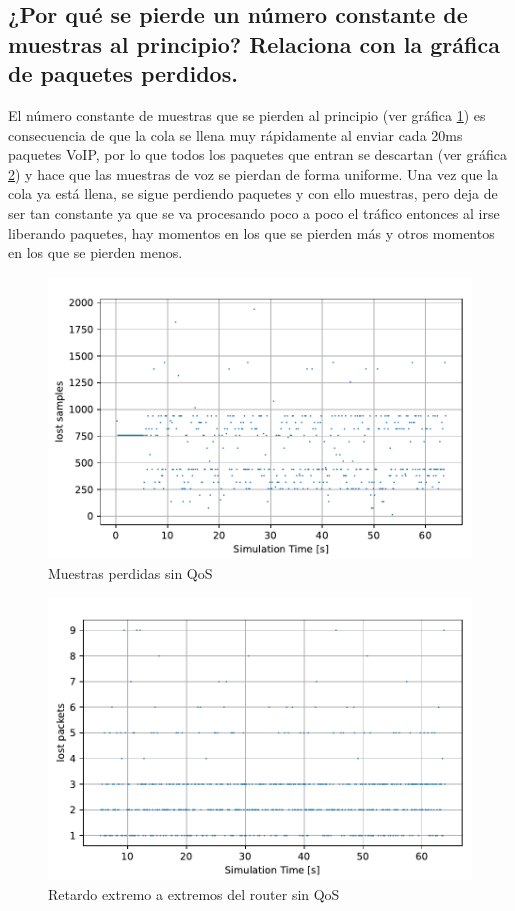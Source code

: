 \subsection{¿Por qué se pierde un número constante de muestras al principio? Relaciona con la gráfica de paquetes
perdidos.}

El número constante de muestras que se pierden al principio (ver gráfica \ref{fig:sinqos_lostsamples}) es consecuencia de que la cola se llena muy 
rápidamente al enviar cada 20ms paquetes VoIP, por lo que todos los paquetes que entran se descartan (ver gráfica \ref{fig:sinqos_lostpkts}) y hace que 
las muestras de voz se pierdan de forma uniforme. Una vez que la cola ya está llena, se sigue perdiendo paquetes y con ello muestras, pero deja de ser tan constante ya que se
va procesando poco a poco el tráfico entonces al irse liberando paquetes, hay momentos en los que se pierden más y otros momentos 
en los que se pierden menos.

\begin{figure}[!ht]
  \centering
  \includegraphics{graficas/sinQoS/ muestras_perdidas_sinQoS.pdf}
  \caption{Muestras perdidas sin QoS}
  \label{fig:sinqos_lostsamples}
\end{figure}

\begin{figure}[!ht]
  \centering
  \includegraphics{graficas/sinQoS/paquetes_perdidos_sinQoS.pdf}
  \caption{Retardo extremo a extremos del router sin QoS}
  \label{fig:sinqos_lostpkts}
\end{figure}